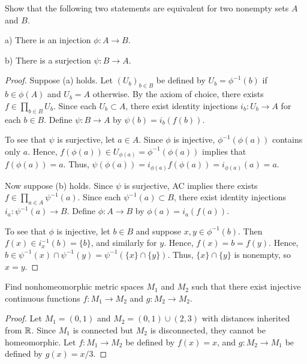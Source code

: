 \documentclass{article}
\begin{document}
 Show that the following two statements are equivalent for two nonempty sets $A$ and $B$.

a) There is an injection $\phi : A \to B$.

b) There is a surjection $\psi : B \to A$.

\begin{proof}
Suppose (a) holds.  Let $(U_b)_{b \in B}$ be defined by $U_b = \phi^{-1}(b)$ if $b \in \phi(A)$ and $U_b = A$ otherwise.  By the axiom of choice, there exists $f \in \prod_{b \in B} U_b$. Since each $U_b \subset A$, there exist identity injections $i_b:U_b \to A$ for each $b \in B$.  Define $\psi: B \to A$ by $\psi(b) = i_b(f(b))$.

To see that $\psi$ is surjective, let $a \in A$.  Since $\phi$ is injective, $\phi^{-1}(\phi(a))$ contains only $a$.  Hence, $f(\phi(a)) \in U_{\phi(a)} = \phi^{-1}(\phi(a))$ implies that $f(\phi(a)) = a$. Thus, $\psi(\phi(a)) = i_{\phi(a)} f(\phi(a)) = i_{\phi(a)}(a) = a$.

Now suppose (b) holds.   Since $\psi$ is surjective, AC implies there exists $f \in \prod_{a \in A} \psi^{-1}(a)$.  Since each $\psi^{-1}(a) \subset B$, there exist identity injections $i_a:\psi^{-1}(a) \to B$.  Define $\phi: A \to B$ by $\phi(a) = i_a(f(a))$.

To see that $\phi$ is injective, let $b \in B$ and suppose $x, y \in \phi^{-1}(b)$. Then $f(x) \in i_x^{-1}(b) = \{b\}$, and similarly for $y$.  Hence, $f(x) = b = f(y)$.  Hence, $b \in \psi^{-1}(x) \cap \psi^{-1}(y) = \psi^{-1}(\{x\} \cap \{y\})$.  Thus, $\{x\} \cap \{y\}$ is nonempty, so $x = y$.
\end{proof}

 Find nonhomeomorphic metric spaces $M_1$ and $M_2$ such that there exist injective continuous functions $f:M_1 \to M_2$ and $g: M_2 \to M_2$.
\begin{proof}
Let $M_1 = (0,1)$ and $M_2 = (0,1) \cup (2,3)$ with distances inherited from $\mathbb{R}$. Since $M_1$ is connected but $M_2$ is disconnected, they cannot be homeomorphic. Let $f:M_1 \to M_2$ be defined by $f(x) = x$, and  $g:M_2 \to M_1$ be defined by $g(x) = x/3$.
\end{proof}
\end{document}
